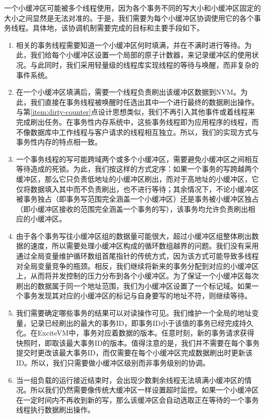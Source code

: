 一个小缓冲区可能被多个线程使用，因为各个事务不同的写大小和小缓冲区固定的大小之间显然是无法对准的。于是，我们需要为每个小缓冲区协调使用它的各个事务线程。具体地，该协调机制需要完成的目标和主要手段如下。
\begin{enumerate}
\item \label{item:dirty-counter} 相关的事务线程需要知道一个小缓冲区何时填满，并在不满时进行等待。为此，我们给每个小缓冲区设置一个局部的原子计数器，来记录缓冲区的使用状况。与此同时，我们采用轻量级的线程库实现线程的等待与唤醒，而非复杂的事件系统。
\item 在一个小缓冲区填满后，需要一个线程负责刷出该缓冲区数据到NVM。为此，我们直接在事务线程被唤醒时任选出其中一个进行最终的数据刷出操作。与第\ref{item:dirty-counter}点设计思想类似，我们不再引入其他事件或着线程来完成刷出任务。在事务性内存系统中，这些事务线程即为应用程序的线程，而不像数据库中工作线程与客户请求的线程相互独立。所以，我们的实现方式与事务性内存的特点相一致。
\item 一个事务线程的写可能跨域两个或多个小缓冲区，需要避免小缓冲区之间相互等待造成的死锁。为此，我们按这样的方式定序：如果一个事务的写跨越两个缓冲区，那么它只负责低地址的小缓冲区刷出，而对于高地址的小缓冲区，它仅将数据填入其中而不负责刷出，也不进行等待；其余情况下，不论小缓冲区被事务独占（即事务写范围完全涵盖一个小缓冲区）还是事务被小缓冲区独占（即小缓冲区接收的范围完全涵盖一个事务的写），该事务均允许负责刷出相应的小缓冲区。
\item 由于各个事务写往小缓冲区组的数据量可能很大，超过小缓冲区组整体刷出数据的速度，所以需要处理小缓冲区构成的循环数组越界的问题。我们没有采用通过全局变量维护循环数组首尾指针的传统方式，因为该方式可能导致多线程对全局变量竞争的瓶颈。相反，我们继续将新来的事务分配到对应的小缓冲区上，从而将并发控制的压力分布到各个小缓冲区。为了保证一个小缓冲区每次刷出的数据属于同一个地址范围，我们为小缓冲区设置了一个标记域。如果一个事务发现其对应的小缓冲区的标记与自身要写的地址不符，则继续等待。
\item 我们需要确定哪些事务的结果可以对读操作可见。我们维护一个全局的地址变量，记录已经刷出的最大的事务ID，即事务ID小于该值的事务已经完成持久化。在ExciteVM中，事务对应着数据的版本。任意时刻，新的事务请求获得快照时，即取该最大事务ID的版本。值得注意的是，我们并不需要在每个事务提交时更改该最大事务ID，而仅需要在每个小缓冲区完成数据刷出时更新该ID。所以，我们只需要做小缓冲区级别而非事务级别的协调。
\item 当一组负载的运行接近结束时，会出现少数剩余线程无法填满小缓冲区的情况。所以我们仍然需要像传统大缓冲区一样设置超时监控。如果一个小缓冲区在一定时间内不再收到新的写，那么该缓冲区会自动选取正在等待的一个事务线程执行数据刷出操作。
\end{enumerate}


